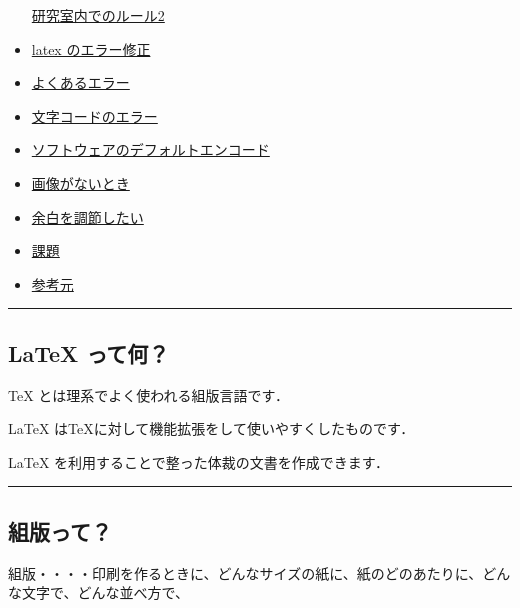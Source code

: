 \begin{itemize}
  \protect\hyperlink{ux7814ux7a76ux5ba4ux5185ux3067ux306eux30ebux30fcux30eb2}{研究室内でのルール2}
\item
  \protect\hyperlink{latex-ux306eux30a8ux30e9ux30fcux4feeux6b63}{latex
  のエラー修正}
\item
  \protect\hyperlink{ux3088ux304fux3042ux308bux30a8ux30e9ux30fc}{よくあるエラー}
\item
  \protect\hyperlink{ux6587ux5b57ux30b3ux30fcux30c9ux306eux30a8ux30e9ux30fc}{文字コードのエラー}
\item
  \protect\hyperlink{ux30bdux30d5ux30c8ux30a6ux30a7ux30a2ux306eux30c7ux30d5ux30a9ux30ebux30c8ux30a8ux30f3ux30b3ux30fcux30c9}{ソフトウェアのデフォルトエンコード}
\item
  \protect\hyperlink{ux753bux50cfux304cux306aux3044ux3068ux304d}{画像がないとき}
\item
  \protect\hyperlink{ux4f59ux767dux3092ux8abfux7bc0ux3057ux305fux3044}{余白を調節したい}
\item
  \protect\hyperlink{ux8ab2ux984c}{課題}
\item
  \protect\hyperlink{ux53c2ux8003ux5143}{参考元}
\end{itemize}

\begin{center}\rule{0.5\linewidth}{\linethickness}\end{center}

\hypertarget{latex-ux3063ux3066ux4f55}{\subsection{LaTeX
って何？}\label{latex-ux3063ux3066ux4f55}}

TeX とは理系でよく使われる組版言語です．

LaTeX はTeXに対して機能拡張をして使いやすくしたものです．

LaTeX を利用することで整った体裁の文書を作成できます．

\begin{center}\rule{0.5\linewidth}{\linethickness}\end{center}

\hypertarget{ux7d44ux7248ux3063ux3066}{\subsection{組版って？}\label{ux7d44ux7248ux3063ux3066}}

組版・・・・印刷を作るときに、どんなサイズの紙に、紙のどのあたりに、どんな文字で、どんな並べ方で、

